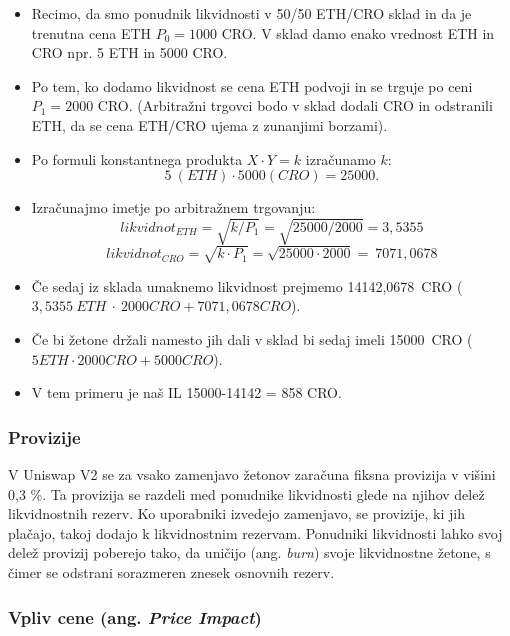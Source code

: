 \documentclass[a4paper,12pt]{article}%
\begin{document}
\begin{itemize}
    \item Recimo, da smo ponudnik likvidnosti v 50/50 ETH/CRO sklad in da je trenutna cena ETH $P_0 = 1000$ CRO. V sklad damo enako vrednost ETH in CRO npr. 5 ETH in 5000 CRO. 
    \item Po tem, ko dodamo likvidnost se cena ETH podvoji in se trguje po ceni $P_1 = 2000$ CRO. (Arbitražni trgovci bodo v sklad dodali CRO in odstranili ETH, da se cena ETH/CRO ujema z zunanjimi borzami).
    \item Po formuli konstantnega produkta $X \cdot Y=k$ izračunamo $k$: $$5~(ETH) \cdot 5000 (CRO) = 25000.$$
    \item Izračunajmo imetje po arbitražnem trgovanju:
        $$likvidnot_{ETH} = \sqrt{k/P_1} = \sqrt{25000/2000}= 3,5355$$
        $$likvidnot_{CRO} = \sqrt{k \cdot P_1} = \sqrt{25000 \cdot 2000}=~7071,0678$$
        
    \item Če sedaj iz sklada umaknemo likvidnost prejmemo 14142,0678~CRO
    ($3,5355~ETH~\cdot~2000 CRO + 7071,0678 CRO$).
    \item Če bi žetone držali namesto jih dali v sklad bi sedaj imeli 15000~CRO ($5 ETH \cdot 2000 CRO + 5000 CRO$).
    \item V tem primeru je naš IL 15000-14142 = 858 CRO.


\end{itemize}

\subsubsection{ Provizije}
V Uniswap V2 se za vsako zamenjavo žetonov zaračuna fiksna provizija v višini 0,3 \%. Ta provizija se razdeli med ponudnike likvidnosti glede na njihov delež likvidnostnih rezerv. Ko uporabniki izvedejo zamenjavo, se provizije, ki jih plačajo, takoj dodajo k likvidnostnim rezervam. Ponudniki likvidnosti lahko svoj delež provizij poberejo tako, da uničijo (ang. \textit{burn}) svoje likvidnostne žetone, s čimer se odstrani sorazmeren znesek osnovnih rezerv.

\subsubsection{Vpliv cene (ang. \textit{Price Impact})}
\end{document}
